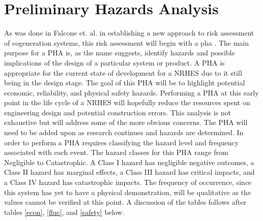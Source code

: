\section{Preliminary Hazards Analysis}
As was done in Falcone et. al. in establishing a new approach to risk assessment of cogeneration systems, this risk assessment will begin with a \ac{pha} \cite{Falcone}. The main purpose for a PHA is, as the name suggests, identify hazards and possible implications of the design of a particular system or product.  A PHA is appropriate for the current state of development for a NRHES due to it still being in the design stage. The goal of this PHA will be to highlight potential economic, reliability, and physical safety hazards. Performing a PHA at this early point in the life cycle of a NRHES will hopefully reduce the resources spent on engineering design and potential construction errors. This analysis is not exhaustive but will address some of the more obvious concerns. The PHA will need to be added upon as research continues and hazards are determined.
	In order to perform a PHA requires classifying the hazard level and frequency associated with each event. The hazard classes for this PHA range from Negligible to Catastrophic. A Class I hazard has negligible negative outcomes, a Class II hazard has marginal effects, a Class III hazard has critical impacts, and a Class IV hazard has catastrophic impacts\cite{ostrom2012risk}.  The frequency of occurrence, since this system has yet to have a physical demonstration, will be qualitative as the values cannot be verified at this point. A discussion of the tables follows after tables \ref{econ}, \ref{fluc}, and \ref{safety} below.

